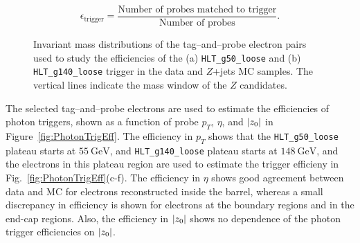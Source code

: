 \begin{equation}
	\label{eq:TrigEff}
    \epsilon_{\mathrm{trigger}} = \frac{\textrm{Number of probes matched to trigger}}{\textrm{Number of probes}}.
\end{equation}
%
\begin{figure}[!htb]
    \centering
    \caption{Invariant mass distributions of the tag--and--probe electron pairs used to study the efficiencies of the (a) \texttt{HLT\_g50\_loose} and (b) \texttt{HLT\_g140\_loose} trigger in the data and $Z$+jets MC samples. The vertical lines indicate the mass window of the $Z$ candidates.
    }
    \label{fig:PhotonTrigMass}
\end{figure}

The selected tag--and--probe electrons are used to estimate the efficiencies of photon triggers, shown as a function of probe $p_{T}$, $\eta$, and $|z_{0}|$ in Figure~\ref{fig:PhotonTrigEff}. The efficiency in $p_{T}$ shows that the \texttt{HLT\_g50\_loose} plateau starts at $55~\si{\GeV}$, and \texttt{HLT\_g140\_loose} plateau starts at $148~\si{\GeV}$, and the electrons in this plateau region are used to estimate the trigger efficieny in Fig.~\ref{fig:PhotonTrigEff}(c-f). The efficiency in $\eta$ shows good agreement between data and MC for electrons reconstructed inside the barrel, whereas a small discrepancy in efficiency is shown for electrons at the boundary regions and in the end-cap regions. Also, the efficiency in $|z_{0}|$ shows no dependence of the photon trigger efficiencies on $|z_{0}|$.

